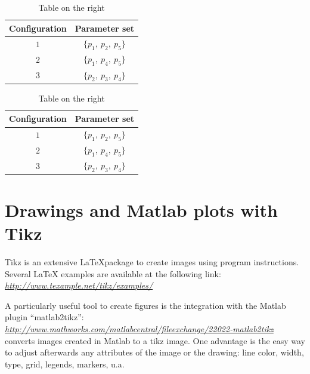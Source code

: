 \begin{table}[htbp]
\caption{Main numbering}
\centering
	\begin{subtable}[t]{.5\textwidth}
	\centering
			\caption{Table on the left}
			\begin{tabular}{cc}
				\toprule
				Configuration & Parameter set \\
				\midrule
				$1$ & $\{p_{1}, \: p_{2}, \: p_{5}\}$ \\
				$2$ & $\{p_{1}, \: p_{4}, \: p_{5}\}$ \\
				$3$ & $\{p_{2}, \: p_{3}, \: p_{4}\}$ \\
				\bottomrule
			\end{tabular}
			\label{tab:parameter_tabelle1}
	\end{subtable}%
	\begin{subtable}[t]{.5\textwidth}
			\centering
			\caption{Table on the right}
			\begin{tabular}{cc}
				\toprule
				Configuration & Parameter set \\
				\midrule
				$1$ & $\{p_{1}, \: p_{2}, \: p_{5}\}$ \\
				$2$ & $\{p_{1}, \: p_{4}, \: p_{5}\}$ \\
				$3$ & $\{p_{2}, \: p_{3}, \: p_{4}\}$ \\
				\bottomrule
			\end{tabular}
			\label{tab:parameter_tabelle2}
	\end{subtable}
	\label{tab:parameter_tabellen}
\end{table}




%
%
%
\clearpage
\section{Drawings and Matlab plots with Tikz}
\label{sec:tikz}

Tikz is an extensive \LaTeX package to create images using program instructions.
Several LaTeX examples are available at the following link: \\
\href{http://www.texample.net/tikz/examples/}{\emph{http://www.texample.net/tikz/examples/}}

A particularly useful tool to create figures is the integration with the Matlab plugin "`matlab2tikz"':\\
\href{http://www.mathworks.com/matlabcentral/fileexchange/22022-matlab2tikz}{\emph{http://www.mathworks.com/matlabcentral/fileexchange/22022-matlab2tikz}}\\
converts images created in Matlab to a tikz image.
One advantage is the easy way to adjust afterwards any attributes of the image or the drawing: line color, width, type, grid, legends, markers, u.a.

